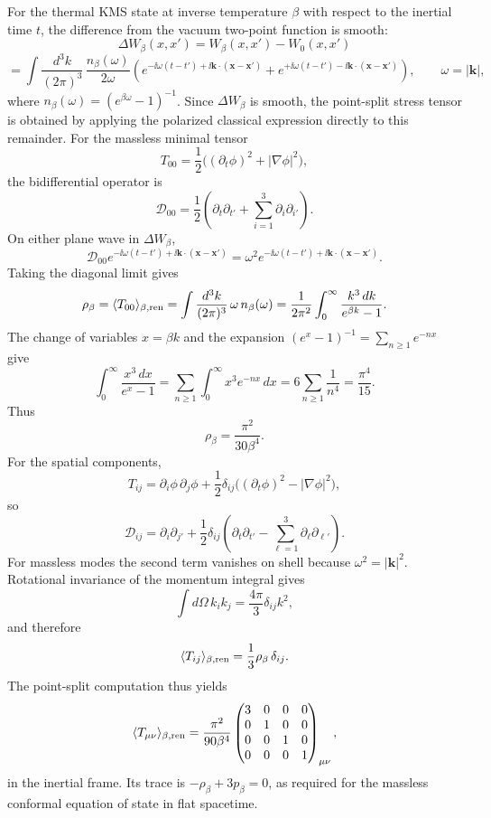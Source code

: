 For the thermal KMS state at inverse temperature \(\beta\) with respect to
the inertial time \(t\), the difference from the vacuum two-point function is
smooth:
\[
  \Delta W_\beta(x,x')
  =
  W_\beta(x,x')-W_0(x,x')
\]
\[
  =
  \int \frac{d^3k}{(2\pi)^3}\,
  \frac{n_\beta(\omega)}{2\omega}
  \left(
  e^{-\ii\omega(t-t')+\ii\mathbf k\cdot(\mathbf x-\mathbf x')}
  +
  e^{+\ii\omega(t-t')-\ii\mathbf k\cdot(\mathbf x-\mathbf x')}
  \right),
  \qquad
  \omega=|\mathbf k|,
\]
where \(n_\beta(\omega)=(e^{\beta\omega}-1)^{-1}\).  Since
\(\Delta W_\beta\) is smooth, the point-split stress tensor is obtained by
applying the polarized classical expression directly to this remainder.
For the massless minimal tensor
\[
  T_{00}
  =
  \frac{1}{2}\bigl((\partial_t\phi)^2+|\nabla\phi|^2\bigr),
\]
the bidifferential operator is
\[
  \mathcal D_{00}
  =
  \frac{1}{2}\left(
  \partial_t\partial_{t'}
  +\sum_{i=1}^3\partial_i\partial_{i'}
  \right).
\]
On either plane wave in \(\Delta W_\beta\),
\[
  \mathcal D_{00}
  e^{-\ii\omega(t-t')+\ii\mathbf k\cdot(\mathbf x-\mathbf x')}
  =
  \omega^2
  e^{-\ii\omega(t-t')+\ii\mathbf k\cdot(\mathbf x-\mathbf x')}.
\]
Taking the diagonal limit gives
\[
  \rho_\beta
  =
  \langle T_{00}\rangle_{\beta,{\rm ren}}
  =
  \int \frac{d^3k}{(2\pi)^3}\,\omega\,n_\beta(\omega)
  =
  \frac{1}{2\pi^2}\int_0^\infty
  \frac{k^3\,dk}{e^{\beta k}-1}.
\]
The change of variables \(x=\beta k\) and the expansion
\((e^x-1)^{-1}=\sum_{n\geq1}e^{-nx}\) give
\[
  \int_0^\infty \frac{x^3\,dx}{e^x-1}
  =
  \sum_{n\geq1}\int_0^\infty x^3e^{-nx}\,dx
  =
  6\sum_{n\geq1}\frac{1}{n^4}
  =
  \frac{\pi^4}{15}.
\]
Thus
\[
  \rho_\beta=\frac{\pi^2}{30\beta^4}.
\]
For the spatial components,
\[
  T_{ij}
  =
  \partial_i\phi\,\partial_j\phi
  +\frac{1}{2}\delta_{ij}
  \bigl((\partial_t\phi)^2-|\nabla\phi|^2\bigr),
\]
so
\[
  \mathcal D_{ij}
  =
  \partial_i\partial_{j'}
  +\frac{1}{2}\delta_{ij}
  \left(
  \partial_t\partial_{t'}
  -\sum_{\ell=1}^3\partial_\ell\partial_{\ell'}
  \right).
\]
For massless modes the second term vanishes on shell because
\(\omega^2=|\mathbf k|^2\).  Rotational invariance of the momentum integral
gives
\[
  \int d\Omega\, k_i k_j=\frac{4\pi}{3}\delta_{ij}k^2,
\]
and therefore
\[
  \langle T_{ij}\rangle_{\beta,{\rm ren}}
  =
  \frac{1}{3}\rho_\beta\,\delta_{ij}.
\]
The point-split computation thus yields
\[
  \langle T_{\mu\nu}\rangle_{\beta,{\rm ren}}
  =
  \frac{\pi^2}{90\beta^4}
  \begin{pmatrix}
  3&0&0&0\\
  0&1&0&0\\
  0&0&1&0\\
  0&0&0&1
  \end{pmatrix}_{\mu\nu},
\]
in the inertial frame.  Its trace is
\(-\rho_\beta+3p_\beta=0\), as required for the massless conformal equation
of state in flat spacetime.

